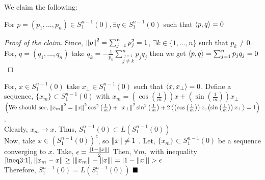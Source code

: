 We claim the following:
\begin{claim}\label{clm1:2}
  For $ p = (p_1, \ldots, p_n) \in S^{n-1}_1(0), \exists q \in S^{n-1}_1(0)$ such that $ \left\langle {p,q} \right\rangle = 0 $
\end{claim}
\begin{proof}[Proof of the claim]
  Since, $ \norm{p}^2 = \sum_{j=1}^{n} p_j^2 =1 $, $ \exists k \in \{1,\ldots,n\} $ such that $ p_k \not= 0 $. For, $ q=(q_1,\ldots,q_n) $ take $ q_k = -\frac{1}{p_k}\sum_{\stackrel{ j=1 }{ j \not= k }}^{n} p_jq_j $ then we get $\left\langle {p,q} \right\rangle = \sum_{j=1}^{n}p_jq_j = 0$
\end{proof}

For, $ x \in S^{n-1}_1(0) $ take $ x_{\perp} \in S^{n-1}_1(0) $ such that $ \left\langle {x,x_{\perp}} \right\rangle = 0 $. Define a sequence, $ \{x_m\} \subset S^{n-1}_1(0) $ with $ x_m = \left(\cos\left(\frac{1}{m}\right)\right)x + \left(\sin\left(\frac{1}{m}\right)\right)x_{\perp} $ 
\\
$
\left( \text{We should see},
  \norm{x_m}^2 
  = \norm{x}^2\cos^2\left(\frac{1}{m}\right) 
  + \norm{x_\perp}^2\sin^2\left(\frac{1}{m}\right) 
  + 2\left\langle {\left(\cos\left(\frac{1}{m}\right)\right)x,\left(\sin\left(\frac{1}{m}\right)\right)x_{\perp}} \right\rangle 
  = 1
\right)$.
\\
Clearly, $ x_m \to x $. Thus, $ S^{n-1}_1(0) \subset L(S^{n-1}_1(0)) $ 
\\
Now, take $ x \in (S^{n-1}_1(0))^c $, so $ \norm{x} \not= 1 $ . Let, $ \{x_m\} \subset S^{n-1}_1(0) $ be a sequence converging to $ x $. Take, $ \epsilon = \frac{\left| {1 - \norm{x}} \right|}{2} $  Then, $ \forall m,$ with inequality $ \ref{ineq3:1}, \norm{x_m-x} \geq \left| {\norm{x_m}-\norm{x}} \right| = \left| {1 - \norm{x}} \right| > \epsilon $ \Contra
\\
Therefore, $ S^{n-1}_1(0) = L(S^{n-1}_1(0)) $ $\QEd$